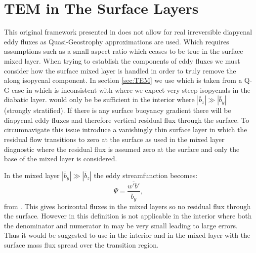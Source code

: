 \section{TEM in The Surface Layers}

This original framework presented in \citet{Marshall2003} does not allow for real irreversible diapycnal eddy fluxes as Quasi-Geostrophy approximations are used. Which requires assumptions such as a small aspect ratio which ceases to be true in the surface mixed layer. When trying to establish the components of eddy fluxes we must consider how the surface mixed layer is handled in order to truly remove the along isopycnal component. In section \ref{sec:TEM} we use  which is taken from a Q-G case in \citet{Andrews1976} which is inconsistent with  where we expect very steep isopycnals in the diabatic layer.   would only be be sufficient in the interior where $\displaystyle{|\overline{b}_z|\gg |\overline{b}_y|}$ (strongly stratified). If there is any surface buoyancy gradient there will be diapycnal eddy fluxes and therefore vertical residual flux through the surface. To circumnavigate this issue \citet{Held1999,treguier1997} introduce a vanishingly thin surface layer in which the residual flow transitions to zero at the surface as used in the mixed layer diagnostic  where the residual flux is assumed zero at the surface and only the base of the mixed layer is considered.   

In the mixed layer $\displaystyle{|\overline{b}_y|\gg |\overline{b}_z|}$ the eddy streamfunction becomes:
\begin{equation}
\Psi = \frac{\overline{w'b'}}{\overline{b}_y},
\label{eq:HS99}
\end{equation}
from \citet{Held1999}.
This gives horizontal fluxes in the mixed layers so no residual flux through the surface. However in this definition is not applicable in the interior where both the denominator and numerator in  may be very small leading to large errors. Thus it would be suggested to use   in the interior and  in the mixed layer with the surface mass flux spread over the transition region. 

